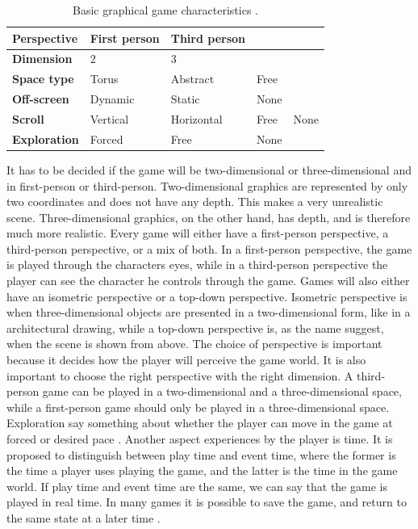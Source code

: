 \begin{table}
\centering
    \begin{tabular}{|l|l|l|l|l|}
        \hline
       \textbf{Perspective} & First person & Third person & &  \\ \hline
       \textbf{Dimension} & 2 & 3 & & \\ \hline
       \textbf{Space type} & Torus & Abstract & Free & \\ \hline
	   \textbf{Off-screen} & Dynamic & Static & None & \\ \hline
	   \textbf{Scroll} & Vertical & Horizontal & Free & None \\ \hline
	   \textbf{Exploration} & Forced & Free & None & \\
        \hline
    \end{tabular}
    \caption[Graphical Characteristics]{Basic graphical game characteristics \cite{understandingvg}.}
    \label{tab:graphic}
\end{table} 

It has to be decided if the game will be two-dimensional or three-dimensional and in first-person or third-person. Two-dimensional graphics are represented by only two coordinates and does not have any depth. This makes a very unrealistic scene. Three-dimensional graphics, on the other hand, has depth, and is therefore much more realistic. Every game will either have a first-person perspective, a third-person perspective, or a mix of both. In a first-person perspective, the game is played through the characters eyes, while in a third-person perspective the player can see the character he controls through the game. Games will also either have an isometric perspective or a top-down perspective. Isometric perspective is when three-dimensional objects are presented in a two-dimensional form, like in a architectural drawing, while a top-down perspective is, as the name suggest, when the scene is shown from above. The choice of perspective is important because it decides how the player will perceive the game world. It is also important to choose the right perspective with the right dimension. A third-person game can be played in a two-dimensional and a three-dimensional space, while a first-person game should only be played in a three-dimensional space. Exploration say something about whether the player can move in the game at forced or desired pace \cite{understandingvg}. Another aspect experiences by the player is time. It is proposed to distinguish between play time and event time, where the former is the time a player uses playing the game, and the latter is the time in the game world. If play time and event time are the same, we can say that the game is played in real time. In many games it is possible to save the game, and return to the same state at a later time \cite{understandingvg}.


